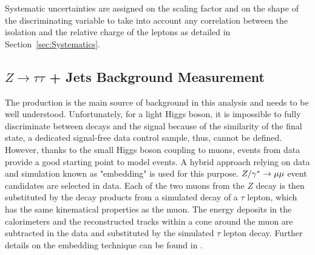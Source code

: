 







Systematic uncertainties are assigned on the scaling factor \rqcd and on the shape of
the discriminating variable \mmc to take into account any correlation between the isolation and the relative charge 
of the leptons as detailed in Section~\ref{sec:Systematics}.





\subsection{$Z \rightarrow \tau\tau$ + Jets Background Measurement}\label{sec:ztau}


The  \Ztautau production is the main  source of  background in this analysis and needs to be well understood.
Unfortunately, for a light Higgs boson, it is impossible to fully discriminate between  \Ztautau decays 
and the signal because of the similarity of the final state, a dedicated signal-free data control sample, thus, cannot be defined.
However, thanks to the small Higgs boson coupling to muons, \Zmumu events from data  provide a good starting point to 
model \Ztautau events. A hybrid approach relying on data and simulation known as  "embedding" is used for this purpose.
$Z/\gamma^* \rightarrow \mu\mu$ event candidates are selected in data. Each of the two muons from the $Z$ decay is then substituted by the decay 
products from a simulated decay of a $\tau$ lepton, which has the same kinematical properties as the muon. 
The energy deposits in the calorimeters and the reconstructed tracks within a cone  around the muon are subtracted in the data
and substituted by the simulated $\tau$ lepton decay.  Further details on the embedding technique can be found in \cite{Embedding, SMold}.

